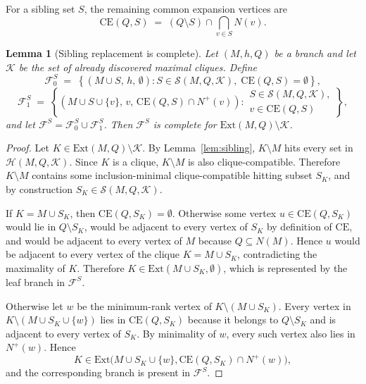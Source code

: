 \documentclass[sigconf, nonacm]{acmart}
\newtheorem{lemma}[theorem]{Lemma}
\theoremstyle{definition}
\theoremstyle{remark}
\begin{document}
For a sibling set $S$, the remaining common expansion vertices are
\[
  \mathrm{CE}(Q,S)
  \;=\;
  (Q \setminus S) \cap \bigcap_{v \in S} N(v).
\]

\begin{lemma}[Sibling replacement is complete]\label{lem:sibling_branch}
Let $(M,h,Q)$ be a branch and let $\mathcal{K}$ be the set of already
discovered maximal cliques.  Define
\[
  \mathcal{F}^{S}_{0}
  \;=\;
  \left\{
    (M \cup S,\, h,\, \emptyset)
    : S \in \mathcal{S}(M,Q,\mathcal{K}),\;
      \mathrm{CE}(Q,S)=\emptyset
  \right\},
\]
\[
  \mathcal{F}^{S}_{1}
  \;=\;
  \left\{
    (M \cup S \cup \{v\},\, v,\, \mathrm{CE}(Q,S) \cap N^+(v))
    : \substack{S \in \mathcal{S}(M,Q,\mathcal{K}),\\
                v \in \mathrm{CE}(Q,S)}
  \right\},
\]
and let $\mathcal{F}^{S} = \mathcal{F}^{S}_{0} \cup \mathcal{F}^{S}_{1}$.
Then $\mathcal{F}^{S}$ is complete for
$\mathrm{Ext}(M,Q) \setminus \mathcal{K}$.
\end{lemma}

\begin{proof}
Let $K \in \mathrm{Ext}(M,Q) \setminus \mathcal{K}$.  By
Lemma~\ref{lem:sibling}, $K \setminus M$ hits every set in
$\mathcal{H}(M,Q,\mathcal{K})$.  Since $K$ is a clique, $K \setminus M$ is also
clique-compatible.  Therefore $K \setminus M$ contains some inclusion-minimal
clique-compatible hitting subset $S_K$, and by construction
$S_K \in \mathcal{S}(M,Q,\mathcal{K})$.

If $K = M \cup S_K$, then $\mathrm{CE}(Q,S_K)=\emptyset$.  Otherwise some
vertex $u \in \mathrm{CE}(Q,S_K)$ would lie in $Q \setminus S_K$, would be
adjacent to every vertex of $S_K$ by definition of $\mathrm{CE}$, and would be
adjacent to every vertex of $M$ because $Q \subseteq N(M)$.  Hence $u$ would be
adjacent to every vertex of the clique $K = M \cup S_K$, contradicting the
maximality of $K$.  Therefore
$K \in \mathrm{Ext}(M \cup S_K,\emptyset)$, which is represented by the leaf
branch in $\mathcal{F}^{S}$.

Otherwise let $w$ be the minimum-rank vertex of $K \setminus (M \cup S_K)$.
Every vertex in $K \setminus (M \cup S_K \cup \{w\})$ lies in
$\mathrm{CE}(Q,S_K)$ because it belongs to $Q \setminus S_K$ and is adjacent to
every vertex of $S_K$.  By minimality of $w$, every such vertex also lies in
$N^+(w)$.  Hence
\[
  K \in \mathrm{Ext}\bigl(M \cup S_K \cup \{w\},
  \mathrm{CE}(Q,S_K) \cap N^+(w)\bigr),
\]
and the corresponding branch is present in $\mathcal{F}^{S}$.
\end{proof}
\end{document}
